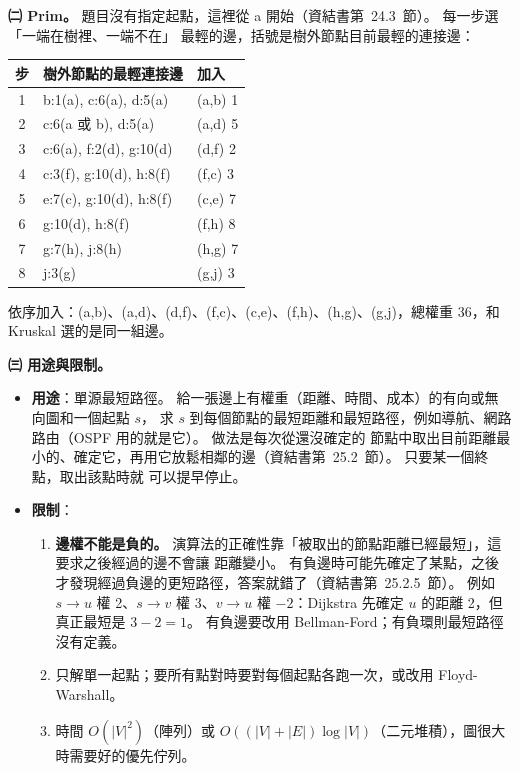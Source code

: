 \begin{pastsoln}
\textbf{㈡ Prim。} 題目沒有指定起點，這裡從 a 開始（資結書第~24.3~節）。 每一步選「一端在樹裡、一端不在」
最輕的邊，括號是樹外節點目前最輕的連接邊：
\begin{center}
\begin{tabular}{cll}
\toprule
步 & 樹外節點的最輕連接邊 & 加入 \\
\midrule
1 & b:1(a), c:6(a), d:5(a) & (a,b) 1 \\
2 & c:6(a 或 b), d:5(a) & (a,d) 5 \\
3 & c:6(a), f:2(d), g:10(d) & (d,f) 2 \\
4 & c:3(f), g:10(d), h:8(f) & (f,c) 3 \\
5 & e:7(c), g:10(d), h:8(f) & (c,e) 7 \\
6 & g:10(d), h:8(f) & (f,h) 8 \\
7 & g:7(h), j:8(h) & (h,g) 7 \\
8 & j:3(g) & (g,j) 3 \\
\bottomrule
\end{tabular}
\end{center}
依序加入：(a,b)、(a,d)、(d,f)、(f,c)、(c,e)、(f,h)、(h,g)、(g,j)，總權重 36，和 Kruskal 選的是同一組邊。

\textbf{㈢ 用途與限制。}
\begin{itemize}
\item \textbf{用途}：單源最短路徑。 給一張邊上有權重（距離、時間、成本）的有向或無向圖和一個起點 $s$，
求 $s$ 到每個節點的最短距離和最短路徑，例如導航、網路路由（OSPF 用的就是它）。 做法是每次從還沒確定的
節點中取出目前距離最小的、確定它，再用它放鬆相鄰的邊（資結書第~25.2~節）。 只要某一個終點，取出該點時就
可以提早停止。
\item \textbf{限制}：
\begin{enumerate}
\item \textbf{邊權不能是負的。} 演算法的正確性靠「被取出的節點距離已經最短」，這要求之後經過的邊不會讓
距離變小。 有負邊時可能先確定了某點，之後才發現經過負邊的更短路徑，答案就錯了（資結書第~25.2.5~節）。
例如 $s \to u$ 權 2、$s \to v$ 權 3、$v \to u$ 權 $-2$：Dijkstra 先確定 $u$ 的距離 2，但真正最短是
$3 - 2 = 1$。 有負邊要改用 Bellman-Ford；有負環則最短路徑沒有定義。
\item 只解單一起點；要所有點對時要對每個起點各跑一次，或改用 Floyd-Warshall。
\item 時間 $O(|V|^2)$（陣列）或 $O((|V|+|E|)\log|V|)$（二元堆積），圖很大時需要好的優先佇列。
\end{enumerate}
\end{itemize}


\end{pastsoln}
